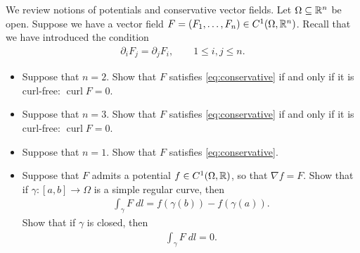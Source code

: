 \documentclass[11pt]{article}
\begin{document}
\begin{exercise}
    We review notions of potentials and conservative vector fields. Let $\Omega \subseteq \mathbb{R}^n$ be open.
    Suppose we have a vector field $F = (F_1,\dots,F_n) \in C^1(\Omega,\mathbb{R}^n)$.
	Recall that we have introduced the condition
    \begin{align}
    \label{eq:conservative}
        \partial_i F_j = \partial_j F_i, \qquad 1 \leq i,j \leq n.
    \end{align}
    \begin{itemize}
     \item Suppose that $n=2$. Show that $F$ satisfies \eqref{eq:conservative} if and only if it is curl-free: $\operatorname{curl} F = 0$.
     \item Suppose that $n=3$. Show that $F$ satisfies \eqref{eq:conservative} if and only if it is curl-free: $\operatorname{curl} F = 0$.
     \item Suppose that $n=1$. Show that $F$ satisfies \eqref{eq:conservative}.
     \item Suppose that $F$ admits a potential $f \in C^1(\Omega,\mathbb{R})$, so that $\nabla f = F$. 
     Show that if $\gamma : [a,b] \rightarrow \Omega$ is a simple regular curve, then 
     \begin{align}
        \int_\gamma F \;dl = f(\gamma(b)) - f(\gamma(a)).
     \end{align}
     Show that if $\gamma$ is closed, then 
     \begin{align}
        \int_\gamma F \;dl = 0.
     \end{align}
    \end{itemize}
\end{exercise}
\end{document}
